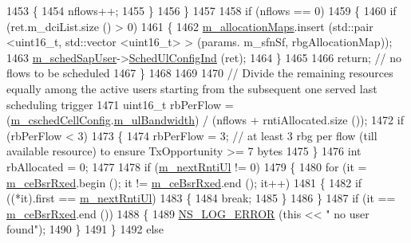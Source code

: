 \begin{DoxyCode}
1453         \{
1454           nflows++;
1455         \}
1456     \}
1457 
1458   \textcolor{keywordflow}{if} (nflows == 0)
1459     \{
1460       \textcolor{keywordflow}{if} (ret.m\_dciList.size () > 0)
1461         \{
1462           \hyperlink{classns3_1_1TdMtFfMacScheduler_a08ce126c31d6c975542dfa7038bd27c8}{m\_allocationMaps}.insert (std::pair <uint16\_t, std::vector <uint16\_t> > (params.
      m\_sfnSf, rbgAllocationMap));
1463           \hyperlink{classns3_1_1TdMtFfMacScheduler_a2e3ce0452adef9b30cce73ac31c93ef4}{m\_schedSapUser}->\hyperlink{classns3_1_1FfMacSchedSapUser_a1b89636256701a84d990db7db8aea874}{SchedUlConfigInd} (ret);
1464         \}
1465         
1466       \textcolor{keywordflow}{return};  \textcolor{comment}{// no flows to be scheduled}
1467     \}
1468 
1469 
1470   \textcolor{comment}{// Divide the remaining resources equally among the active users starting from the subsequent one served
       last scheduling trigger}
1471   uint16\_t rbPerFlow = (\hyperlink{classns3_1_1TdMtFfMacScheduler_a585412f686e33f49dad1003e5d2216f0}{m\_cschedCellConfig}.\hyperlink{structns3_1_1FfMacCschedSapProvider_1_1CschedCellConfigReqParameters_a5ab5b102878e6e7e7727a14af4a64d2f}{m\_ulBandwidth}) / (nflows + 
      rntiAllocated.size ());
1472   \textcolor{keywordflow}{if} (rbPerFlow < 3)
1473     \{
1474       rbPerFlow = 3;  \textcolor{comment}{// at least 3 rbg per flow (till available resource) to ensure TxOpportunity >= 7
       bytes}
1475     \}
1476   \textcolor{keywordtype}{int} rbAllocated = 0;
1477 
1478   \textcolor{keywordflow}{if} (\hyperlink{classns3_1_1TdMtFfMacScheduler_afc4fae2138add1ae9e42970e93046f52}{m\_nextRntiUl} != 0)
1479     \{
1480       \textcolor{keywordflow}{for} (it = \hyperlink{classns3_1_1TdMtFfMacScheduler_a06bec792095027e46fcf5281e4f4e77a}{m\_ceBsrRxed}.begin (); it != \hyperlink{classns3_1_1TdMtFfMacScheduler_a06bec792095027e46fcf5281e4f4e77a}{m\_ceBsrRxed}.end (); it++)
1481         \{
1482           \textcolor{keywordflow}{if} ((*it).first == \hyperlink{classns3_1_1TdMtFfMacScheduler_afc4fae2138add1ae9e42970e93046f52}{m\_nextRntiUl})
1483             \{
1484               \textcolor{keywordflow}{break};
1485             \}
1486         \}
1487       \textcolor{keywordflow}{if} (it == \hyperlink{classns3_1_1TdMtFfMacScheduler_a06bec792095027e46fcf5281e4f4e77a}{m\_ceBsrRxed}.end ())
1488         \{
1489           \hyperlink{group__logging_ga0261a8db1d4ac5f79417d117634fd455}{NS\_LOG\_ERROR} (\textcolor{keyword}{this} << \textcolor{stringliteral}{" no user found"});
1490         \}
1491     \}
1492   \textcolor{keywordflow}{else}

\end{DoxyCode}

